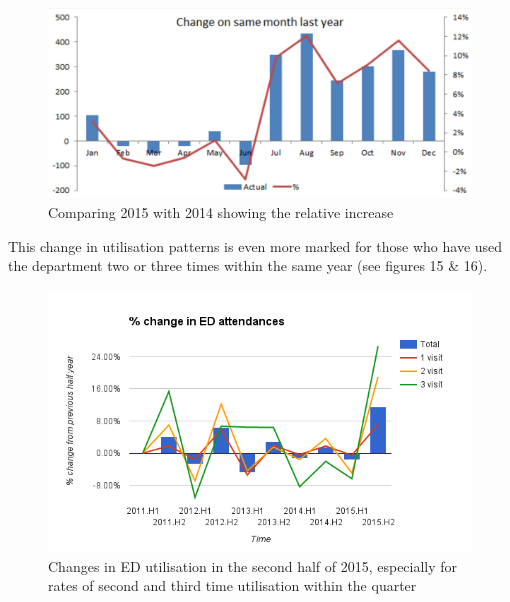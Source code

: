 \documentclass[11pt,a4paper]{article}
\begin{document}
\begin{figure}[htp]
\centering
\includegraphics[scale=0.35]{ED.png}
\caption{Comparing 2015 with 2014 showing the relative increase}
\label{Relative changes in ED utilisation}
\end{figure}


This change in utilisation patterns is even more marked for those who have used the department two or three times within the same year (see figures 15 \& 16).\\


\begin{figure}[htp]
\centering
\includegraphics[scale=0.70]{Fchange.png}
\caption{Changes in ED utilisation in the second half of 2015, especially for rates of second and third time utilisation within the quarter}
\label{Changes in ED utilisation}
\end{figure}
\end{document}
